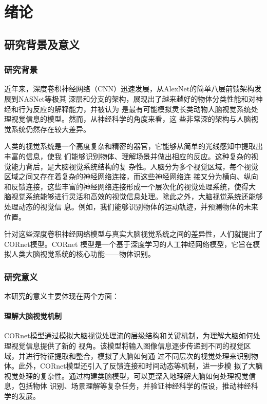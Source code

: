 
\chapter{绪论}

\section{研究背景及意义}

\subsection{研究背景}

近年来，深度卷积神经网络（CNN）迅速发展，从AlexNet的简单八层前馈架构发展到NASNet等极其
深层和分支的架构，展现出了越来越好的物体分类性能和对神经和行为反应的解释能力，并被认为
是最有可能模拟灵长类动物人脑视觉系统处理视觉信息的模型。然而，从神经科学的角度来看，这
些非常深的架构与人脑视觉系统仍然存在较大差异。

人类的视觉系统是一个高度复杂和精密的器官，它能够从简单的光线感知中提取出丰富的信息，使我
们能够识别物体、理解场景并做出相应的反应。这种复杂的视觉能力背后，是大脑视觉系统结构的复
杂性。人脑分为多个视觉区域，每个视觉区域之间又存在着复杂的神经网络连接，而这些神经网络连
接又分为横向、纵向和反馈连接，这些丰富的神经网络连接形成一个层次化的视觉处理系统，使得大
脑视觉系统能够进行灵活和高效的视觉信息处理。除此之外，大脑视觉系统还能够处理动态的视觉信
息。例如，我们能够识别物体的运动轨迹，并预测物体的未来位置。

针对这些深度卷积神经网络模型与真实大脑视觉系统之间的差异性，人们就提出了CORnet模型。CORnet
模型是一个基于深度学习的人工神经网络模型，它旨在模拟人类大脑视觉系统的核心功能——物体识别。

\subsection{研究意义}

本研究的意义主要体现在两个方面：

\subsubsection{理解大脑视觉机制}

CORnet模型通过模拟大脑视觉处理流的层级结构和关键机制，为理解大脑如何处理视觉信息提供了新的
视角。该模型将输入图像信息逐步传递到不同的视觉区域，并进行特征提取和整合，模拟了大脑如何通
过不同层次的视觉处理来识别物体。此外，CORnet模型还引入了反馈连接和时间动态等机制，进一步模
拟了大脑视觉处理的复杂性。通过构建类脑模型，可以更深入地理解大脑如何处理视觉信息，包括物体
识别、场景理解等复杂任务，并验证神经科学的假设，推动神经科学的发展。

